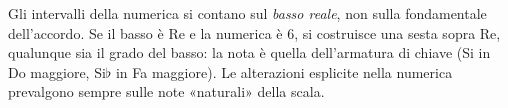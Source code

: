 \begin{osservazione}
	\label{oss:numerica_relativa}
	Gli intervalli della numerica si contano sul \textit{basso reale}, non sulla fondamentale dell'accordo. Se il basso è Re e la numerica è 6, si costruisce una sesta sopra Re, qualunque sia il grado del basso: la nota è quella dell'armatura di chiave (Si in Do maggiore, Si$\flat$ in Fa maggiore). Le alterazioni esplicite nella numerica prevalgono sempre sulle note «naturali» della scala.
\end{osservazione}
